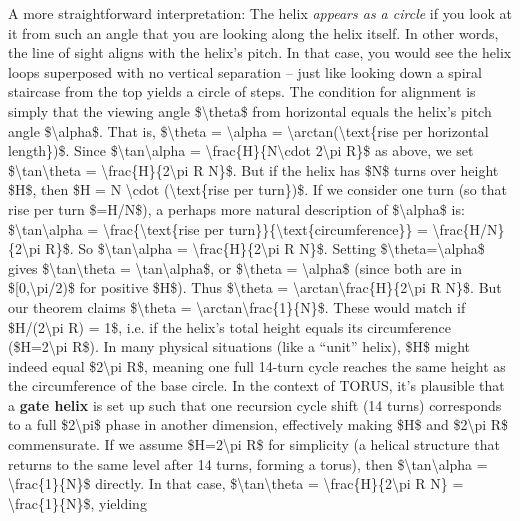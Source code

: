 \documentclass[]{article}
\begin{document}
A more straightforward interpretation: The helix \emph{appears as a
circle} if you look at it from such an angle that you are looking along
the helix itself. In other words, the line of sight aligns with the
helix's pitch. In that case, you would see the helix loops superposed
with no vertical separation -- just like looking down a spiral staircase
from the top yields a circle of steps. The condition for alignment is
simply that the viewing angle \$\textbackslash{}theta\$ from horizontal
equals the helix's pitch angle \$\textbackslash{}alpha\$. That is,
\$\textbackslash{}theta = \textbackslash{}alpha =
\textbackslash{}arctan(\textbackslash{}text\{rise per horizontal
length\})\$. Since \$\textbackslash{}tan\textbackslash{}alpha =
\textbackslash{}frac\{H\}\{N\textbackslash{}cdot 2\textbackslash{}pi
R\}\$ as above, we set \$\textbackslash{}tan\textbackslash{}theta =
\textbackslash{}frac\{H\}\{2\textbackslash{}pi R N\}\$. But if the helix
has \$N\$ turns over height \$H\$, then \$H = N \textbackslash{}cdot
(\textbackslash{}text\{rise per turn\})\$. If we consider one turn (so
that rise per turn \$=H/N\$), a perhaps more natural description of
\$\textbackslash{}alpha\$ is: \$\textbackslash{}tan\textbackslash{}alpha
= \textbackslash{}frac\{\textbackslash{}text\{rise per
turn\}\}\{\textbackslash{}text\{circumference\}\} =
\textbackslash{}frac\{H/N\}\{2\textbackslash{}pi R\}\$. So
\$\textbackslash{}tan\textbackslash{}alpha =
\textbackslash{}frac\{H\}\{2\textbackslash{}pi R N\}\$. Setting
\$\textbackslash{}theta=\textbackslash{}alpha\$ gives
\$\textbackslash{}tan\textbackslash{}theta =
\textbackslash{}tan\textbackslash{}alpha\$, or \$\textbackslash{}theta =
\textbackslash{}alpha\$ (since both are in
\${[}0,\textbackslash{}pi/2)\$ for positive \$H\$). Thus
\$\textbackslash{}theta =
\textbackslash{}arctan\textbackslash{}frac\{H\}\{2\textbackslash{}pi R
N\}\$. But our theorem claims \$\textbackslash{}theta =
\textbackslash{}arctan\textbackslash{}frac\{1\}\{N\}\$. These would
match if \$H/(2\textbackslash{}pi R) = 1\$, i.e. if the helix's total
height equals its circumference (\$H=2\textbackslash{}pi R\$). In many
physical situations (like a ``unit'' helix), \$H\$ might indeed equal
\$2\textbackslash{}pi R\$, meaning one full 14-turn cycle reaches the
same height as the circumference of the base circle. In the context of
TORUS, it's plausible that a \textbf{gate helix} is set up such that one
recursion cycle shift (14 turns) corresponds to a full
\$2\textbackslash{}pi\$ phase in another dimension, effectively making
\$H\$ and \$2\textbackslash{}pi R\$ commensurate. If we assume
\$H=2\textbackslash{}pi R\$ for simplicity (a helical structure that
returns to the same level after 14 turns, forming a torus), then
\$\textbackslash{}tan\textbackslash{}alpha =
\textbackslash{}frac\{1\}\{N\}\$ directly. In that case,
\$\textbackslash{}tan\textbackslash{}theta =
\textbackslash{}frac\{H\}\{2\textbackslash{}pi R N\} =
\textbackslash{}frac\{1\}\{N\}\$, yielding
\end{document}
